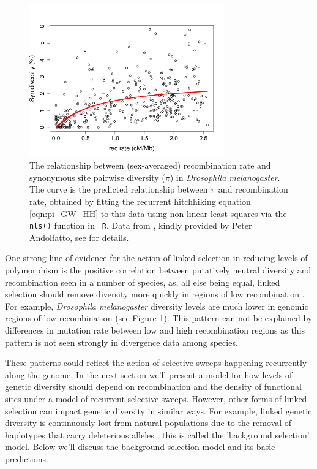 \begin{figure}
\begin{center}
\includegraphics[width=0.75\textwidth]{figures/Genomewide_HH.png}
\end{center}
\caption{The relationship between (sex-averaged) recombination rate and synonymous
  site pairwise diversity ($\pi$) in {\it Drosophila melanogaster}. The curve is the
  predicted relationship between $\pi$ and recombination rate, obtained
  by fitting the recurrent hitchhiking equation \eqref{eqn:pi_GW_HH} to this data 
 using non-linear least squares via the {\tt nls()} function in {\tt
   R}.  Data from \citep{Shapiro:07}, kindly provided by Peter
  Andolfatto, see \citet{sella2009pervasive} for details.} \label{fig:GW_hitchhiking_reduction}  %
\end{figure}

One strong line of evidence for the action of linked selection in reducing levels of
polymorphism is the positive correlation between putatively
neutral diversity and recombination seen in a number of species, as, all
else being equal, linked selection should remove diversity more quickly in regions of low recombination 
\citep{Aguade:89,Begun:92,Wiehe:93,Cutter:10,Cai:09}. For example, {\it Drosophila melanogaster} diversity
levels are much lower in genomic regions of low recombination (see
Figure \ref{fig:GW_hitchhiking_reduction}). This pattern can not be
explained by differences in mutation rate between low and high
recombination regions as this pattern is not seen strongly in
divergence data among species.

These patterns could reflect the action of selective sweeps happening
recurrently along the genome. In the next section we'll present a model for how levels of
genetic diversity should depend on recombination and the density of
functional sites under a model of recurrent selective sweeps.
However, other forms of linked selection can impact genetic
diversity in similar ways. For example, linked genetic diversity is
continuously lost from natural populations due to the removal of
haplotypes that carry deleterious alleles
\citep{Charlesworth:95,Hudson:95}; this is called the 'background selection'
model. Below we'll discuss the background selection model and its
basic predictions.

